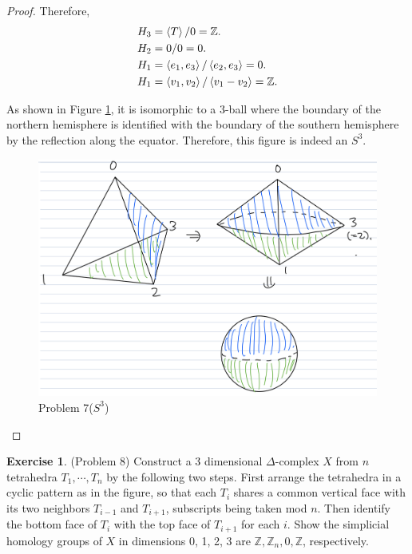 \documentclass[12pt, psamsfonts]{amsart}
\theoremstyle{definition}
\newtheorem*{exer}{Exercise}
\theoremstyle{remark}
\numberwithin{equation}{section}
\begin{document}
\begin{proof}
  Therefore,
  \begin{align*}
    H_3 &= \ev{ T } / 0 = \mathbb{Z}. \\
    H_2 &= 0 / 0 = 0. \\
    H_1 &= \ev{ e_1, e_3 }  / \ev{ e_2, e_3 } = 0. \\
    H_1 &= \ev{ v_1, v_2 }  / \ev{ v_1 - v_2 } = \mathbb{Z}.
  \end{align*}


  As shown in Figure \ref{fig:problem7_s3}, it is isomorphic to a 3-ball where the boundary of the northern hemisphere is identified with the boundary of the southern hemisphere by the reflection along the equator.
  Therefore, this figure is indeed an $S^3$.
  \begin{figure}
    \includegraphics[width=.5\linewidth]{problem7_2.jpeg}
    \caption{Problem 7($S^3$)}
    \label{fig:problem7_s3}
  \end{figure}

\end{proof}

\begin{exer}{(Problem 8)}
  Construct a 3 dimensional $\Delta$-complex $X$ from $n$ tetrahedra $T_1, \cdots, T_n$ by the following two steps.
  First arrange the tetrahedra in a cyclic pattern as in the figure, so that each $T_i$ shares a common vertical face with its two neighbors $T_{i - 1}$ and $T_{i + 1}$, subscripts being taken mod $n$.
  Then identify the bottom face of $T_i$ with the top face of $T_{i + 1}$ for each $i$.
  Show the simplicial homology groups of $X$ in dimensions 0, 1, 2, 3 are $\mathbb{Z}, \mathbb{Z}_n, 0, \mathbb{Z}$, respectively.
\end{exer}
\end{document}
